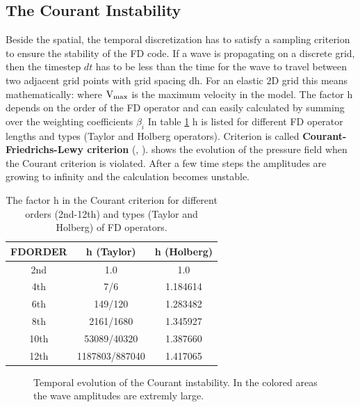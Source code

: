 \documentclass[11pt,onecolumn,oneside]{article}
\begin{document}
\subsection{The Courant Instability}\label{courant}
Beside the spatial, the temporal discretization has to satisfy a sampling criterion to ensure the stability of the FD code. If a 
wave is propagating on a discrete grid, then the timestep $dt$ has to be less than the time for the wave to travel between two adjacent grid 
points with grid spacing dh. For an elastic 2D grid this means mathematically:
where $\rm{V_{max}}$ is the maximum velocity in the model. The factor h depends on the order of the FD operator and can easily calculated by summing over the weighting coefficients $\beta_i$
In table \ref{courant.1} h is listed for different FD operator lengths and types (Taylor and Holberg operators). Criterion  
is called {\bf{Courant-Friedrichs-Lewy criterion}} (\cite{courant:28}, \cite{courant:67}).  shows the evolution of the pressure field when the Courant criterion is violated. After a few time steps the amplitudes are growing to infinity and the calculation becomes unstable.
\begin{table}[hbt]
\begin{center}
\begin{tabular}{ccc}\hline \hline
FDORDER & h (Taylor)      & h (Holberg) \\ \hline 
2nd   &   1.0             &  1.0        \\
4th   &   7/6             &  1.184614   \\
6th   &   149/120         &  1.283482   \\
8th   &   2161/1680       &  1.345927   \\
10th  &   53089/40320     &  1.387660   \\
12th  &   1187803/887040  &  1.417065   \\   
\hline \hline
\end{tabular}
\caption{\label{courant.1} The factor h in the Courant criterion for different orders (2nd-12th) and types (Taylor and Holberg) of FD operators.}
\end{center}
\end{table} 
\clearpage
\begin{figure}[ht]
\begin{center}
\caption{\label{courant_pics} Temporal evolution of the Courant instability. In the colored areas the wave amplitudes are extremly large.}
\end{center}
\end{figure}
\clearpage
\end{document}
